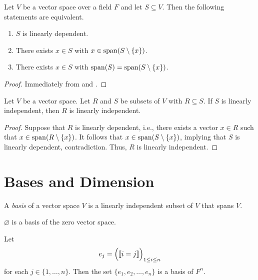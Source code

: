 \begin{theorem}
  \label{thm:linear-dependence-equivalence}
  Let $V$ be a vector space over a field $F$ and let $S \subseteq V$.
  Then the following statements are equivalent.
  \begin{enumerate}
    \item $S$ is linearly dependent.
    \item There exists $x \in S$ with $x \in \operatorname{span}(S \setminus \{x\})$.
    \item There exists $x \in S$ with $\operatorname{span}(S) = \operatorname{span}(S \setminus \{x\})$.
  \end{enumerate}
\end{theorem}
\begin{proof}
  Immediately from  and
  .
\end{proof}

\begin{theorem}
  \label{thm:linear-independence-subset}
  Let $V$ be a vector space.
  Let $R$ and $S$ be subsets of $V$ with $R \subseteq S$.
  If $S$ is linearly independent, then $R$ is linearly independent.
\end{theorem}
\begin{proof}
  Suppose that $R$ is linearly dependent, i.e., there exists a vector $x \in R$
  such that $x \in \operatorname{span}(R \setminus \{x\})$.
  It follows that $x \in \operatorname{span}(S \setminus \{x\})$, implying that $S$ is
  linearly dependent, contradiction.
  Thus, $R$ is linearly independent.
\end{proof}

\section{Bases and Dimension}
\begin{definition}
  \label{def:basis}
  A \emph{basis} of a vector space $V$ is a linearly independent subset of $V$
  that spans $V$.
\end{definition}

\begin{example}
  $\varnothing$ is a basis of the zero vector space.
\end{example}

\begin{example}
  Let
  \begin{equation*}
    e_j = \Bigl( \llbracket i = j \rrbracket \Bigr)_{1 \leq i \leq n}
  \end{equation*}
  for each $j \in \{1, \dots, n\}$.
  Then the set $\{e_1, e_2, \dots, e_n\}$ is a basis of $F^n$.
\end{example}

